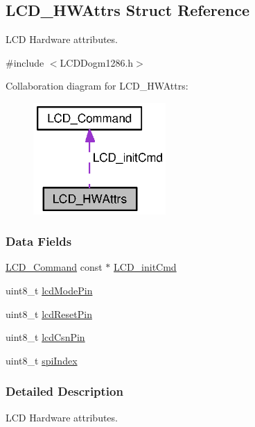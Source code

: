 \subsection{L\-C\-D\-\_\-\-H\-W\-Attrs Struct Reference}
\label{struct_l_c_d___h_w_attrs}


L\-C\-D Hardware attributes.  




{\ttfamily \#include $<$L\-C\-D\-Dogm1286.\-h$>$}



Collaboration diagram for L\-C\-D\-\_\-\-H\-W\-Attrs\-:
\nopagebreak
\begin{figure}[H]
\begin{center}
\leavevmode
\includegraphics[width=143pt]{struct_l_c_d___h_w_attrs__coll__graph}
\end{center}
\end{figure}
\subsubsection*{Data Fields}
\begin{DoxyCompactItemize}
\item 
\hyperlink{struct_l_c_d___command}{L\-C\-D\-\_\-\-Command} const $\ast$ \hyperlink{struct_l_c_d___h_w_attrs_a04de8f9bfd92ed872bbd447177eba7a1}{L\-C\-D\-\_\-init\-Cmd}
\item 
uint8\-\_\-t \hyperlink{struct_l_c_d___h_w_attrs_af2b2c62d70137e4f8727136001e69718}{lcd\-Mode\-Pin}
\item 
uint8\-\_\-t \hyperlink{struct_l_c_d___h_w_attrs_a5a9db2fc62d4c34511507e5843ff82a1}{lcd\-Reset\-Pin}
\item 
uint8\-\_\-t \hyperlink{struct_l_c_d___h_w_attrs_af9926a7b6972357506299ff4893a5ffc}{lcd\-Csn\-Pin}
\item 
uint8\-\_\-t \hyperlink{struct_l_c_d___h_w_attrs_aad817df3726cc746fd22075f4510e9d6}{spi\-Index}
\end{DoxyCompactItemize}


\subsubsection{Detailed Description}
L\-C\-D Hardware attributes. 

